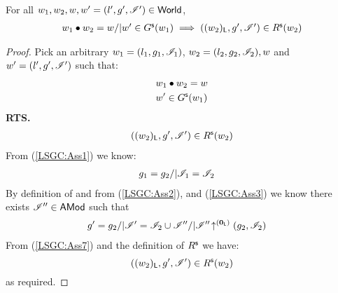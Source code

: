 \begin{lemma}[]\label{lem:shiftGContainment}
%
For all $w_1, w_2, w, w' = (l', g', \mathscr{I}') \in \textsf{World}$, 
\[
\begin{array}{l}
	w_1 \bullet w_2 = w /| w' \in G^{\textsf{s}}(w_1) \implies ((w_2)_{\textsf{L}}, g', \mathscr{I}') \in R^{\textsf{s}}(w_2)
\end{array}
\]
%
\begin{proof} Pick an arbitrary $w_1 = (l_1, g_1, \mathscr{I}_{1})$, $w_2 = (l_2, g_2, \mathscr{I}_{2}), w$ and $w' = (l', g', \mathscr{I}')$ such that:
%
\begin{align}
	& w_1 \bullet w_2 = w \label{LSGC:Ass1}\\
	& w' \in G^{\textsf{s}}(w_1) \label{LSGC:Ass2}
\end{align}
%
\textbf{RTS.}
%
\begin{align*}
	((w_2)_{\textsf{L}}, g', \mathscr{I}') \in R^{\textsf{s}}(w_2) 
\end{align*}
%
From (\ref{LSGC:Ass1}) we know:
%
\begin{align}
	& g_1 = g_2 /| \mathscr{I}_{1} = \mathscr{I}_{2}  \label{LSGC:Ass3}
\end{align}
%
By definition of \shiftG and from (\ref{LSGC:Ass2}), and (\ref{LSGC:Ass3}) we know there exists $\mathscr{I}'' \in \textsf{AMod}$ such that
%
\begin{align}
%
	& g' = g_2 /| \lmod' = \lmod_{2} \cup \lmod'' /| \expandsAM{\lmod''}{\unitL}{g_2}{\lmod_{2}} \label{LSGC:Ass7}
%
\end{align}
%
From (\ref{LSGC:Ass7}) and the definition of $R^{\textsf{s}}$ we have:
%
\begin{equation}
	((w_2)_{\textsf{L}}, g', \mathscr{I}') \in R^{\textsf{s}}(w_2) \nonumber
\end{equation}
% 
as required.
\end{proof}
%
%
\end{lemma}
%
